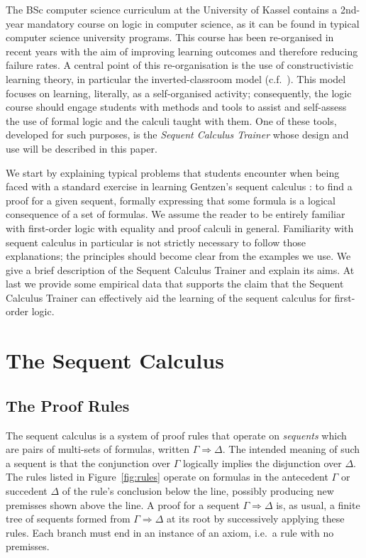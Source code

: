 \documentclass[a4paper,UKenglish]{lipics}
\begin{document}
The BSc computer science curriculum at the University of Kassel contains a 2nd-year mandatory course on logic in computer science, as it can be found
in typical computer science university programs. This course has been re-organised in recent years with the aim of improving learning
outcomes and therefore reducing failure rates. A central point of this re-organisation is the use of constructivistic learning theory, in particular 
the inverted-classroom model (c.f.\ \cite{LPT2000}). This model focuses on learning, literally, as a self-organised activity; consequently, the logic 
course should engage students with methods and tools to assist and self-assess the use of formal logic and the calculi taught with them. One of these 
tools, developed for such purposes, is the \emph{Sequent Calculus Trainer} whose design and use will be described in this paper.

We start by explaining typical problems that students encounter when being faced with a standard exercise in learning Gentzen's sequent calculus
\cite{Gentzen35}: to find a proof for a given sequent, formally expressing that some formula is a logical consequence of a set of formulas. We assume 
the reader to be entirely familiar with first-order logic with equality \cite{eft_logic_book84} and proof calculi in general. Familiarity with 
sequent calculus in particular is not strictly necessary to follow those explanations; the principles should become clear from the examples we
use. We give a brief description of the Sequent Calculus Trainer and explain its aims. At last we provide some empirical data
that supports the claim that the Sequent Calculus Trainer can effectively aid the learning of the sequent calculus for first-order logic.



\section{The Sequent Calculus}

\subsection{The Proof Rules}
The sequent calculus is a system of proof rules that operate on \emph{sequents} which are pairs of multi-sets of formulas, written 
$\Gamma \Longrightarrow \Delta$. The intended meaning of such a sequent is that the conjunction over $\Gamma$ logically implies the disjunction
over $\Delta$. The rules listed in Figure~\ref{fig:rules} operate on formulas in the antecedent $\Gamma$ or succedent $\Delta$ of the rule's 
conclusion below the line, possibly producing new premisses shown above the line. A proof for a sequent $\Gamma \Longrightarrow \Delta$ is, as 
usual, a finite tree of sequents formed from $\Gamma \Longrightarrow \Delta$ at its root by successively applying these rules. Each branch must end in an
instance of an axiom, i.e.\ a rule with no premisses.
\end{document}
